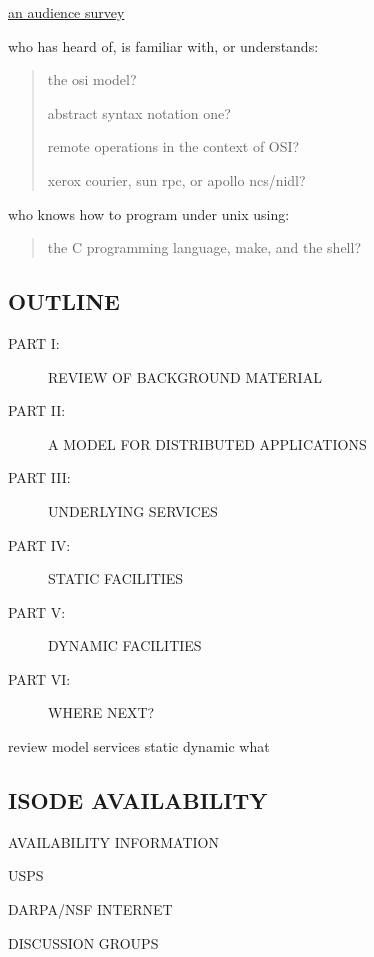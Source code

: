 \begin{note}\em
\begin{center}
\underline{an audience survey}
\end{center}

who has heard of, is familiar with, or understands:
\begin{quote}
the osi model?

abstract syntax notation one?

remote operations in the context of OSI?

xerox courier, sun rpc, or apollo ncs/nidl?
\end{quote}

who knows how to program under unix using:
\begin{quote}
the C programming language, make, and the shell?
\end{quote}
\end{note}


\begin{bwslide}
\part*	{OUTLINE}\bf

\begin{description}
\item[PART I:]		REVIEW OF BACKGROUND MATERIAL

\item[PART II:]		A MODEL FOR DISTRIBUTED APPLICATIONS

\item[PART III:]	UNDERLYING SERVICES

\item[PART IV:]		STATIC FACILITIES

\item[PART V:]		DYNAMIC FACILITIES

\item[PART VI:]		WHERE NEXT?
\end{description}
\end{bwslide}


	{review}
	{model}
	{services}
	{static}
	{dynamic}
	{what}


\begin{bwslide}
\part*	{ISODE AVAILABILITY}\bf

\begin{nrtc}
\item	AVAILABILITY INFORMATION
    \begin{nrtc}
    \item	USPS

    \item	DARPA/NSF INTERNET
    \end{nrtc}

\item	DISCUSSION GROUPS
\end{nrtc}
\end{bwslide}


